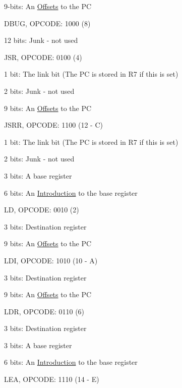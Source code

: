 \begin{DoxyItemize}
\begin{DoxyItemize}
\item 9-\/bits: An \hyperlink{index_offset}{Offsets} to the PC 
\end{DoxyItemize}\item DBUG, OPCODE: 1000 (8) 
\begin{DoxyItemize}
\item 12 bits: Junk -\/ not used 
\end{DoxyItemize}\item JSR, OPCODE: 0100 (4) 
\begin{DoxyItemize}
\item 1 bit: The link bit (The PC is stored in R7 if this is set) 
\item 2 bits: Junk -\/ not used 
\item 9 bits: An \hyperlink{index_offset}{Offsets} to the PC 
\end{DoxyItemize}\item JSRR, OPCODE: 1100 (12 -\/ C) 
\begin{DoxyItemize}
\item 1 bit: The link bit (The PC is stored in R7 if this is set) 
\item 2 bits: Junk -\/ not used 
\item 3 bits: A base register 
\item 6 bits: An \hyperlink{index}{Introduction} to the base register 
\end{DoxyItemize}\item LD, OPCODE: 0010 (2) 
\begin{DoxyItemize}
\item 3 bits: Destination register 
\item 9 bits: An \hyperlink{index_offset}{Offsets} to the PC 
\end{DoxyItemize}\item LDI, OPCODE: 1010 (10 -\/ A) 
\begin{DoxyItemize}
\item 3 bits: Destination register 
\item 9 bits: An \hyperlink{index_offset}{Offsets} to the PC 
\end{DoxyItemize}\item LDR, OPCODE: 0110 (6) 
\begin{DoxyItemize}
\item 3 bits: Destination register 
\item 3 bits: A base register 
\item 6 bits: An \hyperlink{index}{Introduction} to the base register 
\end{DoxyItemize}\item LEA, OPCODE: 1110 (14 -\/ E) 

\end{DoxyItemize}
